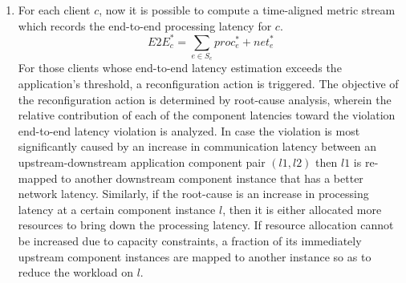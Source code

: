 \begin{enumerate}
\item For each client $c$, now it is possible to compute a time-aligned metric stream which records the end-to-end processing latency for $c$.
\begin{equation}
E2E_c^* = \sum_{e \in S_c} proc_e^* + net_e^*
\end{equation}
For those clients whose end-to-end latency estimation exceeds the application's threshold, a reconfiguration action is triggered. The objective of the reconfiguration action is determined by root-cause analysis, wherein the relative contribution of each of the component latencies toward the violation end-to-end latency violation is analyzed. In case the violation is most significantly caused by an increase in communication latency between an upstream-downstream application component pair $\left( l1, l2 \right)$ then $l1$ is re-mapped to another downstream component instance that has a better network latency. Similarly, if the root-cause is an increase in processing latency at a certain component instance $l$, then it is either allocated more resources to bring down the processing latency. If resource allocation cannot be increased due to capacity constraints, a fraction of its immediately upstream component instances are mapped to another instance so as to reduce the workload on $l$.
\end{enumerate}

